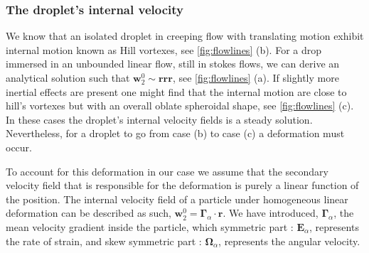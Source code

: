 \subsubsection*{The droplet's internal velocity}


We know that an isolated droplet in creeping flow with translating motion exhibit internal motion known as Hill vortexes, see \ref{fig:flowlines} (b). 
For a drop immersed in an unbounded linear flow, still in stokes flows, we can derive an analytical solution such that $\textbf{w}_2^0 \sim \textbf{rrr}$, see \ref{fig:flowlines} (a). 
If slightly more inertial effects are present one might find that the internal motion are close to hill's vortexes but with an overall oblate spheroidal shape, see \ref{fig:flowlines} (c). 
In these cases the droplet's internal velocity fields is a steady solution.
Nevertheless, for a droplet to go from case (b) to case (c) a deformation must occur. 

To account for this deformation in our case we assume that the secondary velocity field that is responsible for the deformation is purely a linear function of the position. 
The internal velocity field of a particle under homogeneous linear deformation can be described as such, $\textbf{w}_2^0 = \bm\Gamma_\alpha \cdot \textbf{r}$. 
We have introduced, $\bm\Gamma_\alpha$, the mean velocity gradient inside the particle, which symmetric part : $\textbf{E}_\alpha$, represents the rate of strain, and skew symmetric part : $\bm\Omega_\alpha$, represents the angular velocity. 

